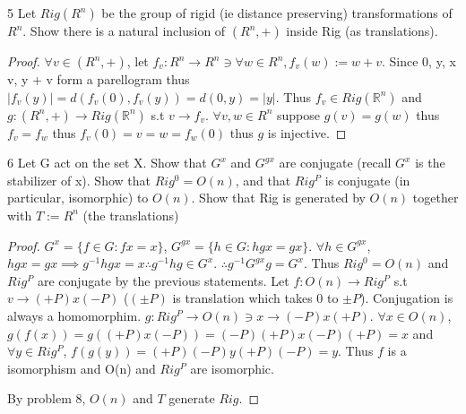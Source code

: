 \documentclass{article}
\newcommand{\R}{\mathbb{R}}
\newcommand{\abs}[1]{\lvert #1\rvert}
\begin{document}
\bigskip

\begin{PROB}{5}\label{Problem 5.}
    Let $Rig(R^n)$ be the group of rigid (ie distance preserving) transformations of $R^n$. Show there is a natural inclusion of $(R^n,+)$ inside Rig (as translations).  
\end{PROB}
\begin{proof}
    $\forall v \in (R^n, +)$, let $f_v: R^n \to R^n \ni \forall w \in R^n, f_v(w) := w + v$. Since 0, y, x v, y + v form a parellogram thus $\abs{f_v(y)} = d(f_v(0), f_v(y)) = d(0, y) = \abs{y}$. Thus $f_v \in Rig(\R^n)$ and $g: (R^n, +) \to Rig(\R^n)$ s.t $v \to f_v$. $\forall v, w \in R^n$ suppose $g(v) = g(w)$ thus $f_v = f_w$ thus $f_v(0) = v = w = f_w(0)$ thus $g$ is injective.
\end{proof}

\bigskip

\begin{PROB}{6}\label{Problem 6.}
    Let G act on the set X. Show that $G^x$ and $G^{gx}$ are conjugate (recall $G^x$ is the stabilizer of x).  Show that $Rig^0 = O(n)$, and that $Rig^P$ is conjugate (in particular, isomorphic) to $O(n)$.  Show that Rig is generated by $O(n)$ together with  $T:= R^n$ (the translations)
\end{PROB}
\begin{proof}
    $G^x = \{f \in G : fx = x\}$, $G^{gx} = \{h \in G: hgx = gx\}$. $\forall h \in G^{gx}$, $hgx = gx \implies g^{-1}hgx = x \therefore g^{-1}hg \in G^x$. $\therefore g^{-1}G^{gx}g = G^x$. Thus $Rig^0 = O(n)$ and $Rig^P$ are conjugate by the previous statements. Let $f: O(n) \to Rig^P$ s.t $v \to (+P)x(-P)$ ($(\pm P)$ is translation which takes 0 to $\pm P$). Conjugation is always a homomorphim. $g: Rig^P \to O(n) \ni x \to (-P) x (+P)$. $\forall x \in O(n)$, $g(f(x)) = g((+P)x(-P)) = (-P)(+P)x(-P)(+P) = x$ and $\forall y \in Rig^P$, $f(g(y)) = (+P)(-P)y(+P)(-P) = y$. Thus $f$ is a isomorphism and O(n) and $Rig^P$ are isomorphic.

    By problem 8, $O(n)$ and $T$ generate $Rig$.
\end{proof}

\bigskip
\end{document}
